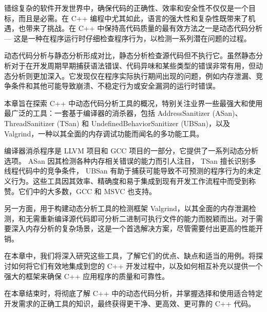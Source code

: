 错综复杂的软件开发世界中，确保代码的正确性、效率和安全性不仅仅是一个目标，而且是必需。在 C++ 编程中尤其如此，语言的强大性和复杂性既带来了机遇，也带来了挑战。在 C++ 中保持高代码质量的最有效方法之一是动态代码分析 --- 这是一种在程序运行时仔细检查程序行为，以检测一系列潜在问题的过程。

动态代码分析与静态分析形成对比，静态分析检查源代码但不执行它。虽然静态分析对于在开发周期早期捕获语法错误、代码异味和某些类型的错误非常有用，但动态分析则更加深入。它发现仅在程序实际执行期间出现的问题，例如内存泄漏、竞争条件和其他可能导致崩溃、不稳定行为或安全漏洞的运行时错误。

本章旨在探索 C++ 中动态代码分析工具的概况，特别关注业界一些最强大和使用最广泛的工具：一套基于编译器的消杀器，包括 AddressSanitizer (ASan)、 ThreadSanitizer (TSan) 和 UndefinedBehaviorSanitizer (UBSan)，以及 Valgrind，一种以其全面的内存调试功能而闻名的多功能工具。

编译器消杀程序是 LLVM 项目和 GCC 项目的一部分，它提供了一系列动态分析选项。 ASan 因其检测各种内存相关错误的能力而引人注目， TSan 擅长识别多线程代码中的竞争条件， UBSan 有助于捕获可能导致不可预测的程序行为的未定义行为。这些工具因其效率、精确度和易于集成到现有开发工作流程中而受到称赞。它们中的大多数，GCC 和 MSVC 也支持。

另一方面，用于构建动态分析工具的检测框架 Valgrind，以其全面的内存泄漏检测，和无需重新编译源代码即可分析二进制可执行文件的能力而脱颖而出。对于需要深入内存分析的复杂场景，这是一个首选解决方案，尽管需要付出更高的性能开销。

在本章中，我们将深入研究这些工具，了解它们的优点、缺点和适当的用例。将探讨如何将它们有效地集成到您的 C++ 开发过程中，以及如何相互补充以提供一个强大的框架来确保 C++ 应用程序的质量和可靠性。

在本章结束时，将彻底了解 C++ 中的动态代码分析，并掌握选择和使用适合特定开发需求的正确工具的知识，最终获得更干净、更高效、更可靠的 C++ 代码。
